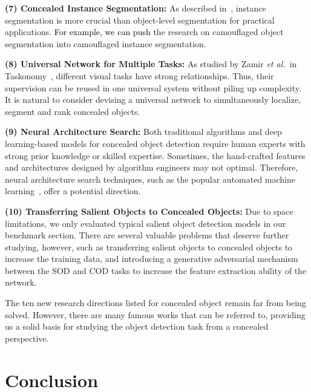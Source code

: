 \documentclass[10pt,journal,compsoc]{IEEEtran}
\def\etal{{\em et al.~}}
\newcommand{\Rev}[1]{\textcolor{black}{#1}}
\begin{document}
\textbf{(7) Concealed Instance Segmentation:} 
As described in~\cite{li2017instance}, 
instance segmentation is more crucial than object-level segmentation 
for practical applications.
\Rev{For example, we can push} the research 
on camouflaged object segmentation into camouflaged instance segmentation. 

\textbf{(8) Universal Network for Multiple Tasks:}
As studied by Zamir \etal in Taskonomy~\cite{zamir2018taskonomy}, 
different visual tasks have strong relationships. 
Thus, their supervision can be reused in one universal system without 
piling up complexity. It is natural to consider devising a universal network 
to simultaneously localize, segment and rank concealed objects. 
 
\textbf{(9) Neural Architecture Search:} 
Both traditional algorithms and deep learning-based models for concealed 
object detection require human experts with strong prior knowledge 
or skilled expertise. 
Sometimes, the hand-crafted features and architectures designed by 
algorithm engineers may not optimal. 
Therefore, neural architecture search techniques, 
such as the popular automated machine learning~\cite{yao2018taking}, 
offer a potential direction.

\textbf{(10) Transferring Salient Objects to Concealed Objects:}
Due to space limitations, we only evaluated typical salient object detection 
models in our benchmark section. 
There are several valuable problems that deserve further studying, 
however, such as transferring salient objects to concealed objects 
to increase the training data, and introducing a generative adversarial 
mechanism between the SOD and COD tasks to 
increase the feature extraction ability of the network.

The ten new research directions listed for concealed object remain far 
from being solved. 
However, there are many famous works that can be referred to, 
providing us a solid basis for studying the object detection task from 
a concealed perspective. 

\section{Conclusion}\label{sec:Conclusion}
\end{document}
